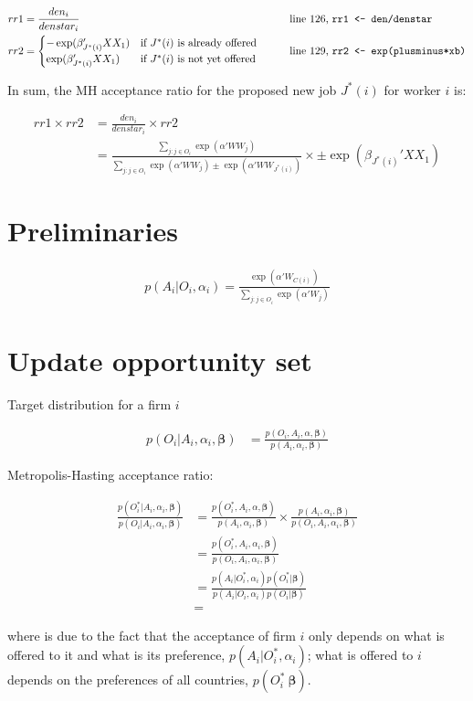 \documentclass[12pt]{article}
\begin{document}
\begin{align}
rr1 &= \frac{den_i}{denstar_i} &&\qquad \text{line 126, \texttt{rr1 <- den/denstar}} \\
rr2 &= \begin{cases}
-\exp(\beta_{J^*(i)}' XX_1) &\text{if } J^*(i) \text{ is already offered} \\
\exp(\beta_{J^*(i)}' XX_1) &\text{if } J^*(i) \text{ is not yet offered}
\end{cases} &&\qquad \text{line 129, \texttt{rr2 <- exp(plusminus*xb)}}
\end{align}

In sum, the MH acceptance ratio for the proposed new job $J^*(i)$ for worker $i$ is:

\begin{align}
rr1 \times rr2 &= \frac{den_i}{denstar_i} \times rr2 \\
&= 
\frac{\sum\limits_{j: j \in O_i} \exp(
\alpha' WW_j)}{\sum\limits_{j: j \in O_i} \exp(
\alpha' WW_j) \pm \exp(\alpha' WW_{J^*(i)})} \times \pm \exp(\beta_{J^*(i)}' XX_1)
\end{align}

\section{Preliminaries}

\begin{align}
p(A_i | O_i, \alpha_i) = \frac{\exp(\alpha'W_{C(i)})}{\sum\limits_{j:j \in O_i} \exp(\alpha'W_j)}
\end{align}
\section{Update opportunity set}

Target distribution for a firm $i$ 

\begin{align}
p(O_i | A_i, \alpha_i, \bm{\beta}) &= \frac{p(O_i, A_i, \alpha, \bm{\beta})}{p(A_i, \alpha_i, \bm{\beta})}
\end{align}

Metropolis-Hasting acceptance ratio:

\begin{align}
\frac{p(O_i^* | A_i, \alpha_i, \bm{\beta})}{p(O_i | A_i, \alpha_i, \bm{\beta})} &= \frac{p(O_i^*, A_i, \alpha, \bm{\beta})}{p(A_i, \alpha_i, \bm{\beta})} \times \frac{p(A_i, \alpha_i, \bm{\beta})}{p(O_i, A_i, \alpha_i, \bm{\beta})} \\
&= \frac{p(O_i^*, A_i, \alpha_i, \bm{\beta})}{p(O_i, A_i, \alpha_i, \bm{\beta})} \\
&= \frac{p(A_i | O_i^*, \alpha_i)p(O_i^*|\bm{\beta})}{p(A_i | O_i, \alpha_i)p(O_i|\bm{\beta})} \label{eq:updateO_joint_dist_into_conditional_dist} \\
&= 
\end{align}

where  is due to the fact that the acceptance of firm $i$ only depends on what is offered to it and what is its preference, $p(A_i | O_i^*, \alpha_i)$; what is offered to $i$ depends on the preferences of all countries, $p(O_i^* \ \bm{\beta})$.
\end{document}
